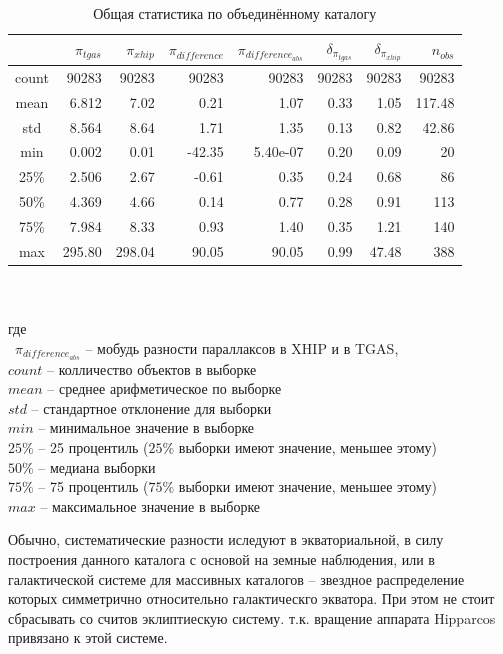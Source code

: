 \documentclass[14pt]{article} %
\begin{document}
\begin{table}[h!]
\caption{Общая статистика по объединённому каталогу}
\label{tabular:tgas_st}
\begin{tabular}{c|r|r|r|r|r|r|r}
\hline 	
&$\pi_{tgas}$&$\pi_{xhip}$&$\pi_{difference}$&$\pi_{difference_{abs}}$&$\delta_{\pi_{tgas}}$&$\delta_{\pi_{xhip}}$&$n_{obs}$\\
\hline
\hline 	
count&90283&90283&90283&90283&90283&90283&90283\\
\hline 
mean&6.812&7.02&0.21&1.07&0.33&1.05&117.48\\
std&8.564&8.64&1.71&1.35&0.13&0.82&42.86\\
min&0.002&0.01&-42.35&5.40e-07&0.20&0.09&20\\
25\%&2.506&2.67&-0.61&0.35&0.24&0.68&86\\
50\%&4.369&4.66&0.14&0.77&0.28&0.91&113\\
75\%&7.984&8.33&0.93&1.40&0.35&1.21&140\\
max&295.80&298.04&90.05&90.05&0.99&47.48&388\\
\end{tabular}\\{\\где\\
~$\pi_{difference_{abs}}$ -- мобудь разности параллаксов в XHIP и в TGAS,\\
$count$ -- колличество объектов в выборке\\
$mean$ -- среднее арифметическое по выборке\\
$std$ -- стандартное отклонение для выборки\\
$min$ -- минимальное значение в выборке\\
$25\%$ -- 25 процентиль ($25\%$ выборки имеют значение, меньшее этому)\\
$50\%$ -- медиана выборки\\
$75\%$ -- 75 процентиль ($75\%$ выборки имеют значение, меньшее этому)\\
$max$ -- максимальное значение в выборке}
\end{table}

Обычно, систематические разности иследуют в экваториальной, в силу построения данного каталога с основой на земные наблюдения, или в галактической системе для массивных каталогов -- звездное распределение которых симметрично относительно галактическго экватора. При этом не стоит сбрасывать со считов эклиптиескую систему. т.к. вращение аппарата Hipparcos привязано к этой системе.
\end{document}
